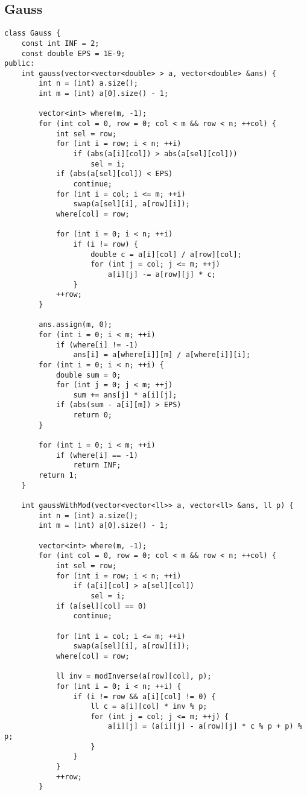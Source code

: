 \documentclass{article}
\begin{document}
\subsection{Gauss}
\begin{verbatim}
class Gauss {
    const int INF = 2;
    const double EPS = 1E-9;
public:
    int gauss(vector<vector<double> > a, vector<double> &ans) {
        int n = (int) a.size();
        int m = (int) a[0].size() - 1;

        vector<int> where(m, -1);
        for (int col = 0, row = 0; col < m && row < n; ++col) {
            int sel = row;
            for (int i = row; i < n; ++i)
                if (abs(a[i][col]) > abs(a[sel][col]))
                    sel = i;
            if (abs(a[sel][col]) < EPS)
                continue;
            for (int i = col; i <= m; ++i)
                swap(a[sel][i], a[row][i]);
            where[col] = row;

            for (int i = 0; i < n; ++i)
                if (i != row) {
                    double c = a[i][col] / a[row][col];
                    for (int j = col; j <= m; ++j)
                        a[i][j] -= a[row][j] * c;
                }
            ++row;
        }

        ans.assign(m, 0);
        for (int i = 0; i < m; ++i)
            if (where[i] != -1)
                ans[i] = a[where[i]][m] / a[where[i]][i];
        for (int i = 0; i < n; ++i) {
            double sum = 0;
            for (int j = 0; j < m; ++j)
                sum += ans[j] * a[i][j];
            if (abs(sum - a[i][m]) > EPS)
                return 0;
        }

        for (int i = 0; i < m; ++i)
            if (where[i] == -1)
                return INF;
        return 1;
    }

    int gaussWithMod(vector<vector<ll>> a, vector<ll> &ans, ll p) {
        int n = (int) a.size();
        int m = (int) a[0].size() - 1;

        vector<int> where(m, -1);
        for (int col = 0, row = 0; col < m && row < n; ++col) {
            int sel = row;
            for (int i = row; i < n; ++i)
                if (a[i][col] > a[sel][col])
                    sel = i;
            if (a[sel][col] == 0)
                continue;

            for (int i = col; i <= m; ++i)
                swap(a[sel][i], a[row][i]);
            where[col] = row;

            ll inv = modInverse(a[row][col], p);
            for (int i = 0; i < n; ++i) {
                if (i != row && a[i][col] != 0) {
                    ll c = a[i][col] * inv % p;
                    for (int j = col; j <= m; ++j) {
                        a[i][j] = (a[i][j] - a[row][j] * c % p + p) % p;
                    }
                }
            }
            ++row;
        }


\end{verbatim}
\end{document}
